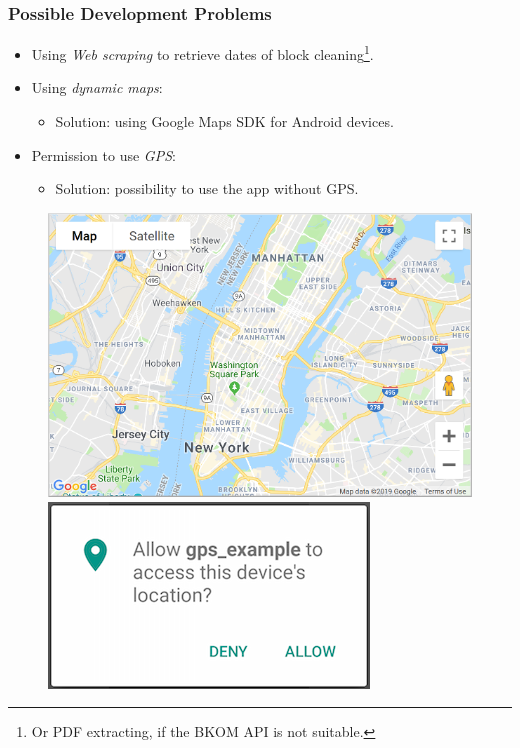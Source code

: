 \documentclass[10pt,xcolor=pdflatex,hyperref={unicode}]{beamer}
\begin{document}
\begin{frame}\frametitle{Possible Development Problems}
    \begin{itemize}
        \item Using \emph{Web scraping} to retrieve dates of block cleaning\footnote[frame]{Or PDF extracting, if the BKOM API is not suitable.}.
        \item Using \emph{dynamic maps}:
            \begin{itemize}
                \item \alert{Solution}: using Google Maps SDK for Android devices.
            \end{itemize}
            
        \item Permission to use \emph{GPS}:
            \begin{itemize}
                \item \alert{Solution}: possibility to use the app without GPS.
            \end{itemize}
    \end{itemize}
        
    \begin{figure}
        \centering
        \begin{minipage}{0.5\textwidth}
            \includegraphics[width=0.5\paperwidth]{img/block-cleaning-2.png}
        \end{minipage}
        \hfill
        \begin{minipage}{0.35\textwidth}
            \raggedleft
            \includegraphics[width=0.3\paperwidth]{img/block-cleaning-3.png}
        \end{minipage}
    \end{figure}
\end{frame}
\end{document}

